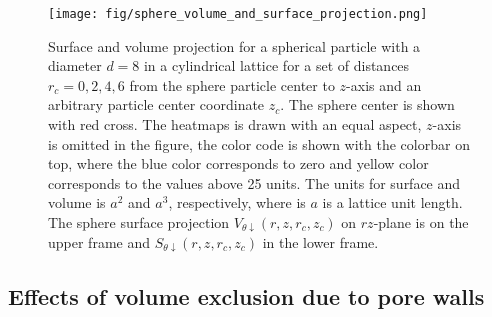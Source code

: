 \documentclass[10pt, a4paper]{article}
\begin{document}
\begin{figure}[H]
    \centering
    \texttt{[image: fig/sphere\_volume\_and\_surface\_projection.png]}
    \caption{
        Surface and volume projection for a spherical particle with a diameter $d=8$ in a cylindrical lattice for a set of distances $r_c = {0, 2, 4, 6}$ from the sphere particle center to $z$-axis and an arbitrary particle center coordinate $z_c$.
        The sphere center is shown with red cross.
        The heatmaps is drawn with an equal aspect, $z$-axis is omitted in the figure, the color code is shown with the colorbar on top, where the blue color corresponds to zero and yellow color corresponds to the values above 25 units.
        The units for surface and volume is $a^2$ and $a^3$, respectively, where is $a$ is a lattice unit length.
        The sphere surface projection $V_{\theta \downarrow}(r, z, r_c, z_c)$ on $rz$-plane is on the upper frame and $S_{\theta \downarrow}(r, z, r_c, z_c)$ in the lower frame.
    }
    \label{fig:sphere_volume_and_surface_projection}
\end{figure}


\subsection*{Effects of volume exclusion due to pore walls}
\end{document}
